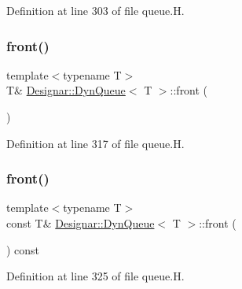 Definition at line 303 of file queue.\+H.

\mbox{\label{class_designar_1_1_dyn_queue_a910f0dc9d3bf1c1b2363730db842980d}} 
\subsubsection{\texorpdfstring{front()}{front()}\hspace{0.1cm}{\footnotesize\ttfamily [1/2]}}
{\footnotesize\ttfamily template$<$typename T$>$ \\
T\& \hyperlink{class_designar_1_1_dyn_queue}{Designar\+::\+Dyn\+Queue}$<$ T $>$\+::front (\begin{DoxyParamCaption}{ }\end{DoxyParamCaption})\hspace{0.3cm}{\ttfamily [inline]}}



Definition at line 317 of file queue.\+H.

\mbox{\label{class_designar_1_1_dyn_queue_ae8e017797ad0ccd8a0568f69f8adedbf}} 
\subsubsection{\texorpdfstring{front()}{front()}\hspace{0.1cm}{\footnotesize\ttfamily [2/2]}}
{\footnotesize\ttfamily template$<$typename T$>$ \\
const T\& \hyperlink{class_designar_1_1_dyn_queue}{Designar\+::\+Dyn\+Queue}$<$ T $>$\+::front (\begin{DoxyParamCaption}{ }\end{DoxyParamCaption}) const\hspace{0.3cm}{\ttfamily [inline]}}



Definition at line 325 of file queue.\+H.

\mbox{\label{class_designar_1_1_dyn_queue_a70b3f577ec11287fe63766de53a2cb56}} 

